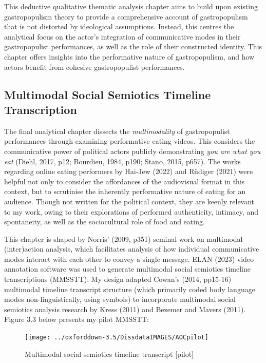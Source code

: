\documentclass[a4paper, nobind]{templates/ociamthesis}
\begin{document}
This deductive qualitative thematic analysis chapter aims to build upon existing gastropopulism theory to provide a comprehensive account of gastropopulism that is not distorted by ideological assumptions. Instead, this centres the analytical focus on the actor's integration of communicative modes in their gastropopulist performances, as well as the role of their constructed identity. This chapter offers insights into the performative nature of gastropopulism, and how actors benefit from cohesive gastropopulist performances.

\hypertarget{multimodal-social-semiotics-timeline-transcription}{%
\subsection*{Multimodal Social Semiotics Timeline Transcription}\label{multimodal-social-semiotics-timeline-transcription}}

The final analytical chapter dissects the \emph{multimodality} of gastropopulist performances through examining performative eating videos. This considers the communicative power of political actors publicly demonstrating \emph{you are what you eat} (Diehl, 2017, p12; Bourdieu, 1984, p190; Stano, 2015, p657). The works regarding online eating performers by Hai-Jew (2022) and Rüdiger (2021) were helpful not only to consider the affordances of the audiovisual format in this context, but to scrutinise the inherently performative nature of eating for an audience. Though not written for the political context, they are keenly relevant to my work, owing to their explorations of performed authenticity, intimacy, and spontaneity, as well as the sociocultural role of food and eating.

This chapter is shaped by Norris' (2009, p351) seminal work on multimodal (inter)action analysis, which facilitates analysis of how individual communicative modes interact with each other to convey a single message. ELAN (2023) video annotation software was used to generate multimodal social semiotics timeline transcriptions (MMSSTT). My design adapted Cowan's (2014, pp15-16) multimodal timeline transcript structure (which primarily coded body language modes non-linguistically, using symbols) to incorporate multimodal social semiotics analysis research by Kress (2011) and Bezemer and Mavers (2011). Figure 3.3 below presents my pilot MMSSTT:

\begin{figure}
\texttt{[image: ../oxforddown-3.5/DissdataIMAGES/AOCpilot]} \caption{Multimodal social semiotics timeline transcript [pilot]}\label{fig:unnamed-chunk-6}
\end{figure}
\end{document}
